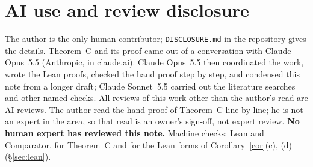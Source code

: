 \documentclass[11pt]{amsart}
\theoremstyle{plain}
\theoremstyle{definition}
\begin{document}
\section{AI use and review disclosure}\label{sec:disclosure}

The author is the only human contributor; \texttt{DISCLOSURE.md} in the repository gives the
details. Theorem~C and its proof came out of a conversation with Claude Opus~5.5 (Anthropic,
in claude.ai). Claude Opus~5.5 then coordinated the work, wrote the Lean
proofs, checked the hand proof step by step, and condensed this note from a longer draft; Claude
Sonnet~5.5 carried out the literature searches and other named checks. All reviews of this work
other than the author's read are AI reviews. The author read the hand proof of Theorem~C line by
line; he is not an expert in the area, so that read is an owner's sign-off, not expert review.
\textbf{No human expert has reviewed this note.} Machine checks: Lean and Comparator, for
Theorem~C and for the Lean forms of Corollary~\ref{cor}(c), (d) (\S\ref{sec:lean}).
\end{document}
